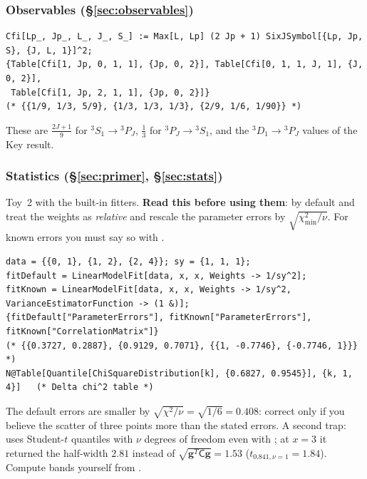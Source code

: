 \documentclass[11pt,a4paper]{article}
\numberwithin{equation}{section}
\theoremstyle{definition}
\theoremstyle{plain}
\theoremstyle{remark}
\numberwithin{algorithm}{section}
\newcommand{\sC}{\mathsf C}
\newcommand{\vg}{\bm g}
\begin{document}
\subsubsection{Observables (\S\ref{sec:observables})}
\begin{lstlisting}[style=wl]
Cfi[Lp_, Jp_, L_, J_, S_] := Max[L, Lp] (2 Jp + 1) SixJSymbol[{Lp, Jp, S}, {J, L, 1}]^2;
{Table[Cfi[1, Jp, 0, 1, 1], {Jp, 0, 2}], Table[Cfi[0, 1, 1, J, 1], {J, 0, 2}],
 Table[Cfi[1, Jp, 2, 1, 1], {Jp, 0, 2}]}
(* {{1/9, 1/3, 5/9}, {1/3, 1/3, 1/3}, {2/9, 1/6, 1/90}} *)
\end{lstlisting}
These are $\frac{2J+1}9$ for ${}^3S_1\to{}^3P_J$, $\frac13$ for ${}^3P_J\to{}^3S_1$, and the ${}^3D_1\to{}^3P_J$ values of the Key result.

\subsubsection{Statistics (\S\ref{sec:primer}, \S\ref{sec:stats})}\label{sec:mma-stats}
Toy~2 with the built-in fitters. \textbf{Read this before using them}: by default  and  treat the weights as \emph{relative} and rescale the parameter errors by $\sqrt{\chi^2_{\min}/\nu}$. For known errors you must say so with .
\begin{lstlisting}[style=wl]
data = {{0, 1}, {1, 2}, {2, 4}}; sy = {1, 1, 1};
fitDefault = LinearModelFit[data, x, x, Weights -> 1/sy^2];
fitKnown = LinearModelFit[data, x, x, Weights -> 1/sy^2, VarianceEstimatorFunction -> (1 &)];
{fitDefault["ParameterErrors"], fitKnown["ParameterErrors"], fitKnown["CorrelationMatrix"]}
(* {{0.3727, 0.2887}, {0.9129, 0.7071}, {{1, -0.7746}, {-0.7746, 1}}} *)
N@Table[Quantile[ChiSquareDistribution[k], {0.6827, 0.9545}], {k, 1, 4}]   (* Delta chi^2 table *)
\end{lstlisting}
The default errors are smaller by $\sqrt{\chi^2/\nu}=\sqrt{1/6}=0.408$: correct only if you believe the scatter of three points more than the stated errors. A second trap:  uses Student-$t$ quantiles with $\nu$ degrees of freedom even with ; at $x=3$ it returned the half-width $2.81$ instead of $\sqrt{\vg^T\sC\vg}=1.53$ ($t_{0.841,\nu=1}=1.84$). Compute bands yourself from .
\end{document}
